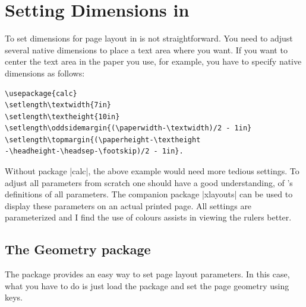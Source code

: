
 
\section{Setting Dimensions in \latex}

To set dimensions for page layout in \latex is not straightforward. You need to adjust several \latex
native dimensions to place a text area where you want. If you want to center the text area in the paper
you use, for example, you have to specify native dimensions as follows:

\begin{verbatim}
\usepackage{calc}
\setlength\textwidth{7in}
\setlength\textheight{10in}
\setlength\oddsidemargin{(\paperwidth-\textwidth)/2 - 1in}
\setlength\topmargin{(\paperheight-\textheight
-\headheight-\headsep-\footskip)/2 - 1in}.
\end{verbatim}

Without package |calc|, the above example would need more tedious settings. To adjust all parameters from scratch one should have a good understanding, of \latexe's definitions of all parameters. The companion package |xlayouts| can be used to display these parameters on an actual printed page. All settings are parameterized and I find the use of colours assists in viewing the rulers better.


\subsection{The Geometry package}

The package  \cite{geometry} provides
an easy way to set page layout parameters. In this case, what you have to do is just load the package and set
the page geometry using keys.


